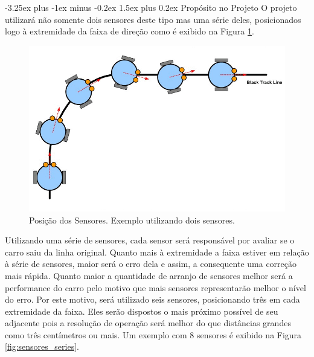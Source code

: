 \documentclass[portugues, brazil, a4paper,12pt]{article}
\makeatletter
\renewcommand{\paragraph}{\@startsection{paragraph}{4}{0ex}%
   {-3.25ex plus -1ex minus -0.2ex}%
   {1.5ex plus 0.2ex}%
   {\normalfont\normalsize\bfseries}}
\makeatother
\begin{document}
			\paragraph{Propósito no Projeto}
				O projeto utilizará não somente dois sensores deste tipo mas uma série deles, posicionados logo à extremidade da faixa de direção como é exibido na Figura \ref{fig:dois_sensores}.

				\begin{figure}[H]
					\centering
					\includegraphics[width=0.9\linewidth]{img/elementos-line_tracking.png}
					\caption{Posição dos Sensores. Exemplo utilizando dois sensores.}
					\label{fig:dois_sensores}
				\end{figure}

				Utilizando uma série de sensores, cada sensor será responsável por avaliar se o carro saiu da linha original. Quanto mais à extremidade a faixa estiver em relação à série de sensores, maior será o erro dela e assim, a consequente uma correção mais rápida. Quanto maior a quantidade de arranjo de sensores melhor será a performance do carro pelo motivo que mais sensores representarão melhor o nível do erro. Por este motivo, será utilizado seis sensores, posicionando três em cada extremidade da faixa. Eles serão dispostos o mais próximo possível de seu adjacente pois a resolução de operação será melhor do que distâncias grandes como três centímetros ou mais. Um exemplo com 8 sensores é exibido na Figura \ref{fig:sensores_series}.
\end{document}
